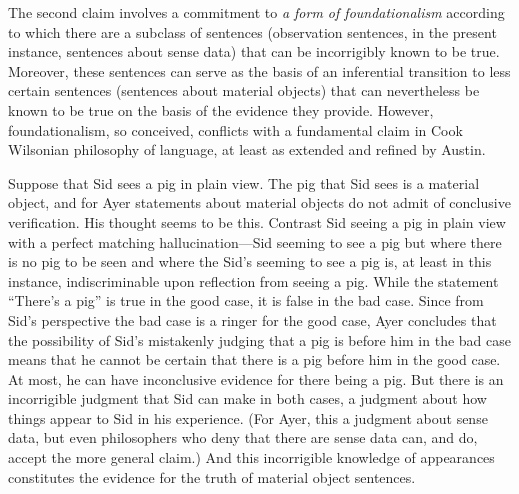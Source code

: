 The second claim involves a commitment to \emph{a form of foundationalism} according to which there are a subclass of sentences (observation sentences, in the present instance, sentences about sense data) that can be incorrigibly known to be true. Moreover, these sentences can serve as the basis of an inferential transition to less certain sentences (sentences about material objects) that can nevertheless be known to be true on the basis of the evidence they provide. However, foundationalism, so conceived, conflicts with a fundamental claim in Cook Wilsonian philosophy of language, at least as extended and refined by Austin. 

Suppose that Sid sees a pig in plain view. The pig that Sid sees is a material object, and for Ayer statements about material objects do not admit of conclusive verification. His thought seems to be this. Contrast Sid seeing a pig in plain view with a perfect matching hallucination---Sid seeming to see a pig but where there is no pig to be seen and where the Sid's seeming to see a pig is, at least in this instance, indiscriminable upon reflection from seeing a pig. While the statement ``There's a pig'' is true in the good case, it is false in the bad case. Since from Sid's perspective the bad case is a ringer for the good case, Ayer concludes that the possibility of Sid's mistakenly judging that a pig is before him in the bad case means that he cannot be certain that there is a pig before him in the good case. At most, he can have inconclusive evidence for there being a pig. But there is an incorrigible judgment that Sid can make in both cases, a judgment about how things appear to Sid in his experience. (For Ayer, this a judgment about sense data, but even philosophers who deny that there are sense data can, and do, accept the more general claim.) And this incorrigible knowledge of appearances constitutes the evidence for the truth of material object sentences.

